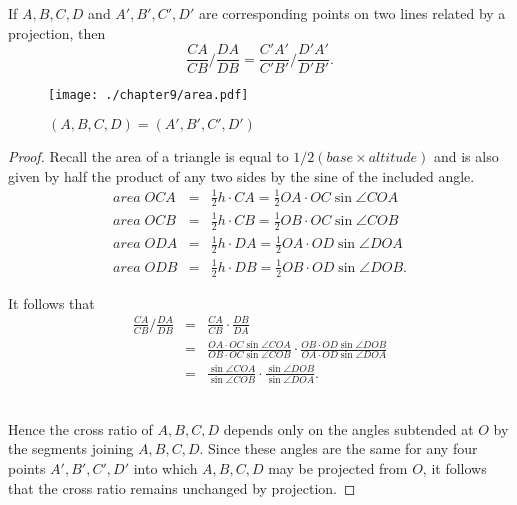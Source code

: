 \begin{theorem}
If $A,B,C,D$ and $A',B',C',D'$ are corresponding points on two lines related by a projection, then \[
\frac{CA}{CB} / \frac{DA}{DB}= \frac{C'A'}{C'B'} / \frac{D'A'}{D'B'}.\]
\begin{figure}[hbp] %
\centering
\texttt{[image: ./chapter9/area.pdf]} 
\caption{$(A,B,C,D)= (A',B',C',D')$} 
\label{fig:area}
\end{figure}
\begin{proof}
Recall the area of a triangle is equal to $1/2(base \times altitude)$ and is also given by half the product of any two sides by the sine of the included angle. 
\begin{eqnarray*}
area \;OCA &=& \frac{1}{2}h \cdot CA = \frac{1}{2}OA\cdot OC \sin \angle COA\\
area \;OCB &=& \frac{1}{2}h \cdot CB = \frac{1}{2}OB\cdot OC \sin \angle COB\\
area \;ODA &=& \frac{1}{2}h \cdot DA = \frac{1}{2}OA\cdot OD \sin \angle DOA\\
area \;ODB &=& \frac{1}{2}h \cdot DB = \frac{1}{2}OB\cdot OD \sin \angle DOB.
\end{eqnarray*}

It follows that
\begin{eqnarray*}
\frac{CA}{CB} / \frac{DA}{DB}&=& \frac{CA}{CB} \cdot \frac{DB}{DA}\\
&=&\frac{OA\cdot OC \sin \angle COA}{OB\cdot OC \sin \angle COB}\cdot \frac{OB\cdot OD \sin \angle DOB}{OA\cdot OD \sin \angle DOA}\\
&=& \frac{\sin \angle COA}{\sin \angle COB}\cdot \frac{\sin \angle DOB}{ \sin \angle DOA}.
\end{eqnarray*}\

Hence the cross ratio of $A,B,C,D$ depends only on the angles subtended at $O$ by the segments joining $A,B,C,D$. Since these angles are the same for any four points $A',B',C',D'$ into which $A,B,C,D$ may be projected from $O$, it follows that the cross ratio remains unchanged by projection. 
\end{proof}

\end{theorem}

